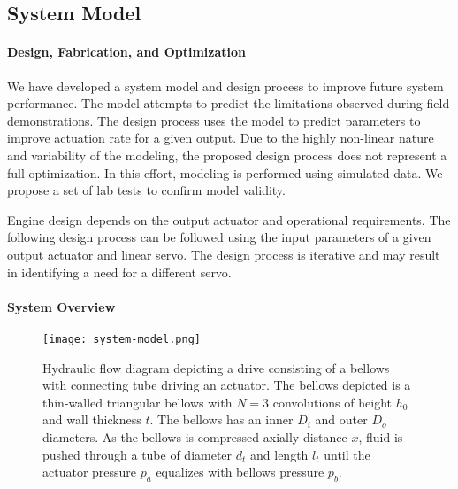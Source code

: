 \hypertarget{ch1:system-model}{%
\subsection{System Model}\label{ch1:system-model}}

\hypertarget{ch1:design-fabrication-and-optimization}{%
\paragraph{Design, Fabrication, and
Optimization}\label{ch1:design-fabrication-and-optimization}}

We have developed a system model and design process to improve future system performance.
The model attempts to predict the limitations observed during field demonstrations.
The design process uses the model to predict parameters to improve actuation rate for a given output.
Due to the highly non-linear nature and variability of the modeling, 
the proposed design process does not represent a full optimization.
In this effort, modeling is performed using simulated data. 
We propose a set of lab tests to confirm model validity.

Engine design depends on the output actuator and operational
requirements. The following design process can be followed using the
input parameters of a given output actuator and linear servo. The design
process is iterative and may result in identifying a need for a different
servo.

\hypertarget{ch1:system-overview}{%
\paragraph{System Overview}\label{ch1:system-overview}}

\begin{figure}
\hypertarget{ch1:fig:model}{%
\centering
\texttt{[image: system-model.png]}
\caption{Hydraulic flow diagram depicting a drive consisting of a
bellows with connecting tube driving an actuator. The bellows depicted
is a thin-walled triangular bellows with \(N=3\) convolutions of height
\(h_0\) and wall thickness \(t\). The bellows has an inner \(D_i\) and
outer \(D_o\) diameters. As the bellows is compressed axially distance
\(x\), fluid is pushed through a tube of diameter \(d_t\) and length
\(l_t\) until the actuator pressure \(p_a\) equalizes with bellows
pressure \(p_b\).}\label{ch1:fig:model}
}
\end{figure}

